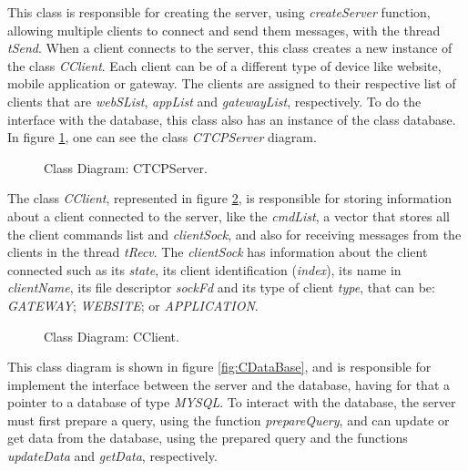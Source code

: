 This class is responsible for creating the server, using \textit{createServer} function, allowing multiple clients to connect and send them messages, with the thread \textit{tSend}. When a client connects to the server, this class creates a new instance of the class \textit{CClient}. Each client can be of a different type of device like website, mobile application or gateway. The clients are assigned to their respective list of clients that are \textit{webSList}, \textit{appList} and \textit{gatewayList}, respectively. To do the interface with the database, this class also has an instance of the class database. In figure \ref{fig:CTCPServer}, one can see the class \textit{CTCPServer} diagram.

\begin{figure}[H]
	\centering
	\caption{Class Diagram: CTCPServer.}
	\label{fig:CTCPServer}
\end{figure}

The class \textit{CClient}, represented in figure \ref{fig:CClient}, is responsible for storing information about a client connected to the server, like the \textit{cmdList}, a vector that stores all the client commands list and \textit{clientSock}, and also for receiving messages from the clients in the thread \textit{tRecv}. The \textit{clientSock} has information about the client connected such as its \textit{state}, its client identification (\textit{index}), its name in \textit{clientName}, its file descriptor \textit{sockFd} and its type of client \textit{type}, that can be: \textit{GATEWAY}; \textit{WEBSITE}; or \textit{APPLICATION}.

\begin{figure}[H]
	\centering
	\caption{Class Diagram: CClient.}
	\label{fig:CClient}
\end{figure}

This class diagram is shown in figure \ref{fig:CDataBase}, and is responsible for implement the interface between the server and the database, having for that a pointer to a database of type \textit{MYSQL}. To interact with the database, the server must first prepare a query, using the function \textit{prepareQuery}, and can update or get data from the database, using the prepared query and the functions \textit{updateData} and \textit{getData}, respectively.

